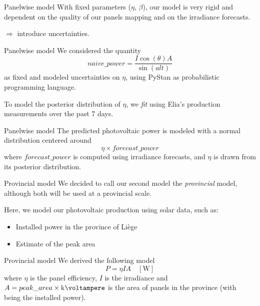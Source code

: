 \documentclass[12pt]{beamer}
\makeatletter
\def\blfootnote{\gdef\@thefnmark{}\@footnotetext}
\makeatother
\begin{document}
\begin{frame}{Panelwise model}
    With \alert{fixed} parameters ($\eta$, $\beta$), our model is very rigid and dependent on the quality of our \alert{panels mapping} and on the irradiance \alert{forecasts}.
    
    $\Rightarrow$ introduce uncertainties.
\end{frame}

\begin{frame}{Panelwise model}
    We considered the quantity
    \begin{equation*}
        naive\_power = \frac{I \cos(\theta) A}{\sin(alt)}
    \end{equation*}
    as fixed and modeled uncertainties on $\eta$, using \alert{PyStan} as probabilistic programming language.
    
    To model the \alert{posterior} distribution of $\eta$, we \emph{fit} using Elia's production measurements over the past 7 days.
\end{frame}

\begin{frame}{Panelwise model}
    The predicted photovoltaic power is modeled with a \alert{normal} distribution centered around
    \begin{equation*}
        \eta \times forecast\_power
    \end{equation*}
    where $forecast\_power$ is computed using irradiance \alert{forecasts}, and $\eta$ is drawn from its posterior distribution.
    
    \blfootnote{Results will be shown later.}
\end{frame}

\begin{frame}{Provincial model}
    We decided to call our \alert{second} model the \emph{provincial} model, although both will be used at a provincial scale.
    
    Here, we model our photovoltaic production using solar data, such as:
    \begin{itemize}
        \item Installed power in the province of Liège
        \item Estimate of the peak area
    \end{itemize}
\end{frame}

\begin{frame}{Provincial model}
    We derived the following model
    \begin{equation*}
        P = \eta I A \quad [\si{\watt}]
    \end{equation*}
    where $\eta$ is the panel efficiency, $I$ is the irradiance and $A = peak\_area \times \si{\kilo\voltampere}$ is the area of panels in the province (with \si{\kilo\voltampere} being the installed power).
\end{frame}
\end{document}
